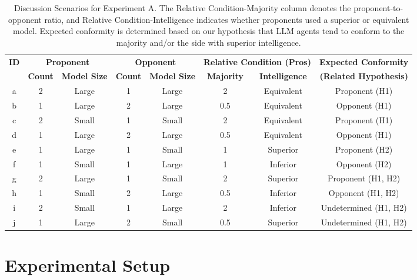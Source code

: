 \documentclass[11pt]{article}
\begin{document}
\begin{table}[t]
\centering
\caption{Discussion Scenarios for Experiment A. The Relative Condition-Majority column denotes the proponent-to-opponent ratio, and Relative Condition-Intelligence indicates whether proponents used a superior or equivalent model. Expected conformity is determined based on our hypothesis that LLM agents tend to conform to the majority and/or the side with superior intelligence.}
\label{tab:experimentA}
\renewcommand{\arraystretch}{1.2}
\setcounter{footnote}{0}
\begin{tabular}{c|cc|cc|cc|c}
\toprule
\textbf{ID} & \multicolumn{2}{c|}{\textbf{Proponent}} & \multicolumn{2}{c|}{\textbf{Opponent}} & \multicolumn{2}{c|}{\textbf{Relative Condition (Pros)}} & \textbf{Expected Conformity} \\
 & \textbf{Count} & \textbf{Model Size} & \textbf{Count} & \textbf{Model Size} & \textbf{Majority} & \textbf{Intelligence} & \textbf{(Related Hypothesis)}\\
\hline
a  & 2  & Large & 1  & Large & 2     & Equivalent & Proponent (H1) \\
b  & 1  & Large & 2  & Large & 0.5   & Equivalent & Opponent (H1) \\
c  & 2  & Small & 1  & Small & 2     & Equivalent & Proponent (H1) \\
d  & 1  & Large & 2  & Large & 0.5   & Equivalent & Opponent (H1) \\
\hline
e  & 1  & Large & 1  & Small & 1     & Superior   & Proponent (H2) \\
f  & 1  & Small & 1  & Large & 1     & Inferior   & Opponent (H2) \\
\hline
g  & 2  & Large & 1  & Small & 2     & Superior   & Proponent (H1, H2) \\
h  & 1  & Small & 2  & Large & 0.5   & Inferior   & Opponent (H1, H2) \\
i  & 2  & Small & 1  & Large & 2     & Inferior   & Undetermined (H1, H2) \\
j  & 1  & Large & 2  & Small & 0.5   & Superior   & Undetermined (H1, H2) \\
\bottomrule
\end{tabular}
\vspace{2mm}
\end{table}




\section{Experimental Setup}
\end{document}
